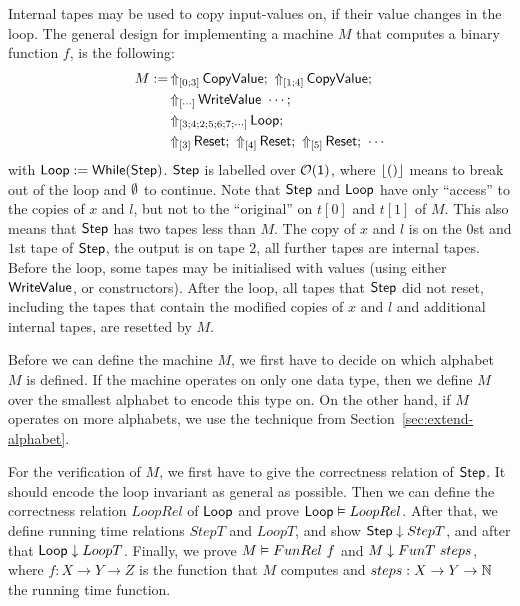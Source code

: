 Internal tapes may be used to copy input-values on, if their value changes in the loop.  The general design for implementing a machine $M$ that
computes a binary function $f$, is the following:
\begin{align*}
  M := & \LiftTapes{\MS{CopyValue}}{\Vector{0; 3}} \Seq \LiftTapes{\MS{CopyValue}}{\Vector{1; 4}} \Seq \\
       & \LiftTapes{\MS{WriteValue}~\cdots}{\Vector{\cdots}} \Seq \\
       & \LiftTapes{\MS{Loop}}{\Vector{3; 4; 2; 5; 6; 7; \cdots}} \Seq \\
       & \LiftTapes{\MS{Reset}}{\Vector{3}} \Seq \LiftTapes{\MS{Reset}}{\Vector{4}} \Seq \LiftTapes{\MS{Reset}}{\Vector{5}} \Seq \cdots
\end{align*}
with $\mathsf{Loop} := \mathsf{While}(\mathsf{Step})$.  $\mathsf{Step}$ is labelled over $\mathcal{O}(\mathsf{1})$, where $\left\lfloor {\ensuremath{\mathsf{()}}} \right\rfloor$ means to break out of the loop and
$\emptyset$ to continue.  Note that $\mathsf{Step}$ and $\mathsf{Loop}$ have only ``access'' to the copies of $x$ and $l$, but not to the ``original'' on $t[0]$
and $t[1]$ of $M$.  This also means that $\mathsf{Step}$ has two tapes less than $M$.  The copy of $x$ and $l$ is on the $0$st and $1$st tape of
$\mathsf{Step}$, the output is on tape $2$, all further tapes are internal tapes.  Before the loop, some tapes may be initialised with values (using
either $\mathsf{WriteValue}$, or constructors).  After the loop, all tapes that $\mathsf{Step}$ did not reset, including the tapes that contain the modified
copies of $x$ and $l$ and additional internal tapes, are resetted by $M$.

Before we can define the machine $M$, we first have to decide on which alphabet $M$ is defined.  If the machine operates on only one data type, then
we define $M$ over the smallest alphabet to encode this type on.  On the other hand, if $M$ operates on more alphabets, we use the technique from
Section~\ref{sec:extend-alphabet}.

For the verification of $M$, we first have to give the correctness relation of $\mathsf{Step}$.  It should encode the loop invariant as general as
possible.  Then we can define the correctness relation $LoopRel$ of $\mathsf{Loop}$ and prove $\mathsf{Loop} \mathrel{\vDash} LoopRel$.  After that, we define running
time relations $StepT$ and $LoopT$, and show $\mathsf{Step} \mathrel{\downarrow} StepT$, and after that $\mathsf{Loop} \mathrel{\downarrow} LoopT$.  Finally, we prove
$M \mathrel{\vDash} FunRel~f$ and $M \mathrel{\downarrow} FunT~steps$, where $f:X \to Y \to Z$ is the function that $M$ computes and $steps:X \rightarrow Y \rightarrow \mathbb{N}$ the
running time function.


